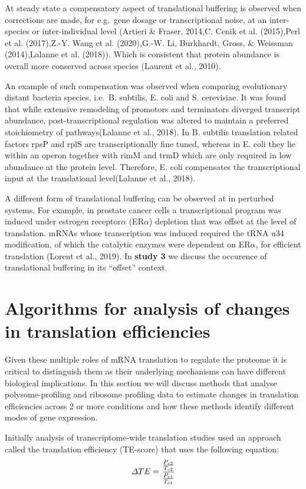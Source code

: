 \documentclass[12pt,openany]{book}
\begin{document}
At steady state a compensatory aspect of translational buffering is
observed when corrections are made, for e.g.~gene dosage or
transcriptional noise, at an inter-species or inter-individual level
(Artieri \& Fraser, 2014,C. Cenik et al. (2015),Perl et al. (2017),Z.-Y.
Wang et al. (2020),G.-W. Li, Burkhardt, Gross, \& Weissman
(2014),Lalanne et al. (2018)). Which is consistent that protein
abundance is overall more conserved across species (Laurent et al.,
2010).

An example of such compensation was observed when comparing evolutionary
distant bacteria species, i.e.~B. subtilis, E. coli and S. cerevisiae.
It was found that while extensive remodeling of promotors and
terminators diverged transcript abundance, post-transcriptional
regulation was altered to maintain a preferred stoichiometry of
pathways(Lalanne et al., 2018). In B. subtilis translation related
factors rpsP and rplS are transcriptionally fine tuned, whereas in E.
coli they lie within an operon together with rimM and trmD which are
only required in low abundance at the protein level. Therefore, E. coli
compensates the transcriptional input at the translational level(Lalanne
et al., 2018).

A different form of translational buffering can be observed at in
perturbed systems. For example, in prostate cancer cells a
transcriptional program was induced under estrogen receptor\(\alpha\)
(ER\(\alpha\)) depletion that was offset at the level of translation.
mRNAs whose transcription was induced required the tRNA u34
modification, of which the catalytic enzymes were dependent on
ER\(\alpha\), for efficient translation (Lorent et al., 2019). In
\textbf{study 3} we discuss the occurence of translational buffering in
its ``offset'' context.

\section{Algorithms for analysis of changes in translation efficiencies}\label{algorithm}

Given these multiple roles of mRNA translation to regulate the proteome
it is critical to distinguish them as their underlying mechanisms can
have different biological implications. In this section we will discuss
methods that analyse polysome-profiling and ribosome profiling data to
estimate changes in translation efficiencies across 2 or more conditions
and how these methods identify different modes of gene expression.

Initially analysis of transcriptome-wide translation studies used an
approach called the translation efficiency (TE-score) that uses the
following equation:
\[\varDelta TE = \frac{\frac{P_{c2}}{T_{c2}}} {\frac{P_{c1}}{T_{c1}}}\\\]
\end{document}
